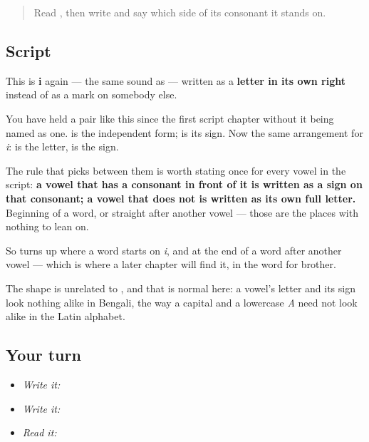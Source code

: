 \begin{quote}
Read \textbf{}, then write \textbf{} and say which side of its consonant it stands on.
\end{quote}

\subsection*{Script}

\begin{quote}
\end{quote}

This is \textbf{i} again — the same sound as \textbf{} — written as a \textbf{letter in its own right} instead of as a mark on somebody else.

You have held a pair like this since the first script chapter without it being named as one. \textbf{} is the independent form; \textbf{} is its sign. Now the same arrangement for \emph{i}: \textbf{} is the letter, \textbf{} is the sign.

The rule that picks between them is worth stating once for every vowel in the script: \textbf{a vowel that has a consonant in front of it is written as a sign on that consonant; a vowel that does not is written as its own full letter.} Beginning of a word, or straight after another vowel — those are the places with nothing to lean on.

So \textbf{} turns up where a word starts on \emph{i}, and at the end of a word after another vowel — which is where a later chapter will find it, in the word for brother.

The shape is unrelated to \textbf{}, and that is normal here: a vowel's letter and its sign look nothing alike in Bengali, the way a capital and a lowercase \emph{A} need not look alike in the Latin alphabet.

\subsection*{Your turn}
\begin{itemize}
\raggedright
  \item \emph{Write it:} 
  \item \emph{Write it:}    
  \item \emph{Read it:} 
\end{itemize}

